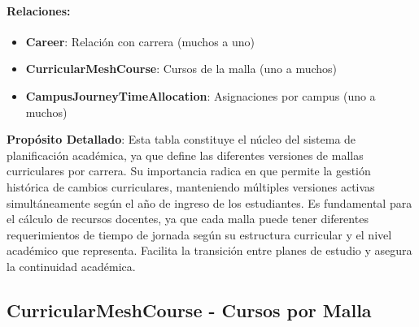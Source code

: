 \documentclass[11pt,a4paper]{article}
\begin{document}
\paragraph{Relaciones:}
\begin{itemize}
    \item \textbf{Career}: Relación con carrera (muchos a uno)
    \item \textbf{CurricularMeshCourse}: Cursos de la malla (uno a muchos)
    \item \textbf{CampusJourneyTimeAllocation}: Asignaciones por campus (uno a muchos)
\end{itemize}

\vspace{0.5cm}

\textbf{Propósito Detallado}: Esta tabla constituye el núcleo del sistema de planificación académica, ya que define las diferentes versiones de mallas curriculares por carrera. Su importancia radica en que permite la gestión histórica de cambios curriculares, manteniendo múltiples versiones activas simultáneamente según el año de ingreso de los estudiantes. Es fundamental para el cálculo de recursos docentes, ya que cada malla puede tener diferentes requerimientos de tiempo de jornada según su estructura curricular y el nivel académico que representa. Facilita la transición entre planes de estudio y asegura la continuidad académica.

{\color{darkblue}\Large\subsection{CurricularMeshCourse - Cursos por Malla}}
\end{document}
